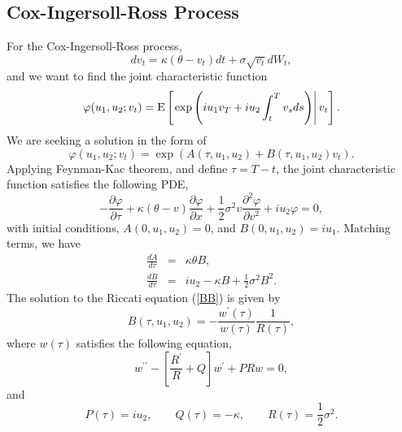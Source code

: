 \documentclass[12pt]{article}
\begin{document}
  \subsection{Cox-Ingersoll-Ross Process}

    For the Cox-Ingersoll-Ross process,
    \begin{equation}
      dv_t = \kappa(\theta - v_t)dt + \sigma\sqrt{v_t}dW_t,
    \end{equation}
    and we want to find the joint characteristic function
    \begin{equation}
      \varphi(u_1,u_2;v_t)={\rm E}\left[\left. \exp\left(iu_1v_T+iu_2\int_t^Tv_sds\right)\right| v_t\right].
    \end{equation}
    We are seeking a solution in the form of
    \begin{equation}
      \varphi(u_1,u_2;v_t)=\exp\left(A(\tau,u_1,u_2)+B(\tau,u_1,u_2)v_t\right).
    \end{equation}
    Applying Feynman-Kac theorem, and define $\tau=T-t$, the joint characteristic function satisfies the following PDE,
    \begin{equation}
      -\frac{\partial \varphi}{\partial \tau}
      + \kappa(\theta - v)\frac{\partial \varphi}{\partial x}
      +\frac{1}{2}\sigma^2v\frac{\partial^2 \varphi}{\partial v^2}
      +iu_2\varphi = 0,
    \end{equation}
    with initial conditions, $A(0,u_1,u_2)=0$, and $B(0,u_1,u_2)=iu_1$. Matching terms, we have
    \begin{eqnarray}
      \frac{dA}{d\tau} &=& \kappa\theta B, \label{AA} \\
      \frac{dB}{d\tau} &=& iu_2 - \kappa B + \frac{1}{2}\sigma^2B^2. \label{BB}
    \end{eqnarray}
    The solution to the Riccati equation (\ref{BB}) is given by
    \begin{equation}
      B(\tau,u_1,u_2)=-\frac{w^{\prime}(\tau)}{w(\tau)}\frac{1}{R(\tau)},
    \end{equation}
    where $w(\tau)$ satisfies the following equation,
    \begin{equation}
      w^{\prime\prime}-\left[\frac{R^{\prime}}{R}+Q\right]w^{\prime}+PRw=0,
    \end{equation}
    and
    \begin{equation}
      P(\tau) = iu_2, \quad\quad Q(\tau)=-\kappa, \quad\quad R(\tau)=\frac{1}{2}\sigma^2.
    \end{equation}


\end{document}
